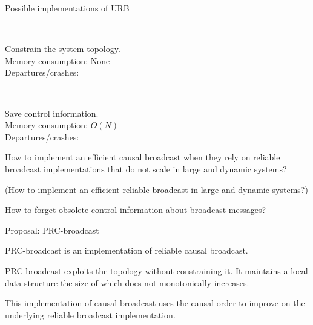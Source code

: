 \documentclass[10pt, xcolor={usenames, dvipsnames}]{beamer}
\newcommand{\cmark}{\ding{51}}
\newcommand{\xmark}{\ding{55}}
\newcommand{\YES}[1]{\textcolor{green}{#1}}
\newcommand{\NO}[1]{\textcolor{red}{#1}}
\begin{document}
\begin{frame}{Possible implementations of URB}
  
  \begin{minipage}{0.49\textwidth}
      
  \end{minipage}~
  \begin{minipage}{0.49\textwidth}
    \begin{center}
      
    \end{center}
  \end{minipage}
  \begin{minipage}{0.49\textwidth}
    \vspace{1em}
    Constrain the system topology.\\
    Memory consumption: None \YES{\cmark}\\
    Departures/crashes: \NO{\xmark}
  \end{minipage}~
  \begin{minipage}{0.49\textwidth}
    \vspace{1em}
    Save control information.\\
    Memory consumption: $O(N)$ \NO{\xmark}\\
    Departures/crashes: \YES{\cmark}
  \end{minipage}
  
\end{frame}

\begin{frame}[standout]
  
  How to implement an efficient causal broadcast when they rely on reliable
  broadcast implementations that do not scale in large and dynamic systems?
  
  \vspace{2em}
  \large
  (How to implement an efficient reliable broadcast in large and
  dynamic systems?)

\end{frame}

\begin{frame}[standout] 
  How to forget obsolete control information about broadcast messages?
\end{frame}


\begin{frame}{Proposal: PRC-broadcast}

  PRC-broadcast is an implementation of reliable causal broadcast.

  \vspace{1em}
  
  PRC-broadcast exploits the topology without constraining it. It maintains a
  local data structure the size of which does not monotonically increases.

  \vspace{1em}
  
  This implementation of causal broadcast uses the causal order to improve on
  the underlying reliable broadcast implementation.

\end{frame}
\end{document}
